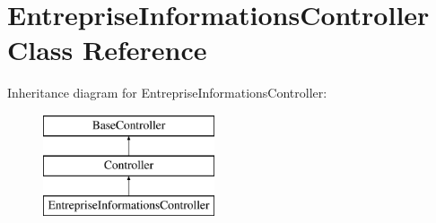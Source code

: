 \hypertarget{class_app_1_1_http_1_1_controllers_1_1_entreprise_informations_controller}{}\section{Entreprise\+Informations\+Controller Class Reference}
\label{class_app_1_1_http_1_1_controllers_1_1_entreprise_informations_controller}
Inheritance diagram for Entreprise\+Informations\+Controller\+:\begin{figure}[H]
\begin{center}
\leavevmode
\includegraphics[height=3.000000cm]{class_app_1_1_http_1_1_controllers_1_1_entreprise_informations_controller}
\end{center}
\end{figure}
